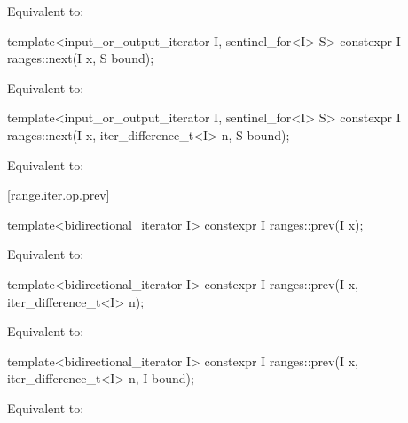 \begin{itemdescr}
\pnum
\effects
Equivalent to: 
\end{itemdescr}

%
\begin{itemdecl}
template<input_or_output_iterator I, sentinel_for<I> S>
  constexpr I ranges::next(I x, S bound);
\end{itemdecl}

\begin{itemdescr}
\pnum
\effects
Equivalent to: 
\end{itemdescr}

%
\begin{itemdecl}
template<input_or_output_iterator I, sentinel_for<I> S>
  constexpr I ranges::next(I x, iter_difference_t<I> n, S bound);
\end{itemdecl}

\begin{itemdescr}
\pnum
\effects
Equivalent to: 
\end{itemdescr}

[range.iter.op.prev]{}
%
\begin{itemdecl}
template<bidirectional_iterator I>
  constexpr I ranges::prev(I x);
\end{itemdecl}

\begin{itemdescr}
\pnum
\effects
Equivalent to: 
\end{itemdescr}

%
\begin{itemdecl}
template<bidirectional_iterator I>
  constexpr I ranges::prev(I x, iter_difference_t<I> n);
\end{itemdecl}

\begin{itemdescr}
\pnum
\effects
Equivalent to: 
\end{itemdescr}

%
\begin{itemdecl}
template<bidirectional_iterator I>
  constexpr I ranges::prev(I x, iter_difference_t<I> n, I bound);
\end{itemdecl}

\begin{itemdescr}
\pnum
\effects
Equivalent to: 
\end{itemdescr}


